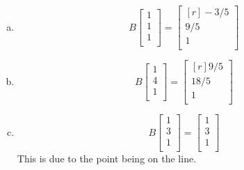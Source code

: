 \documentclass[../main.tex]{subfiles}
\begin{document}
\begin{enumerate}[a)]
	\item
		\[
			B
			\begin{bmatrix}
				1 \\
				1 \\
				1 \\
			\end{bmatrix}
			=
			\begin{bmatrix*}[r]
				-3/5 \\
				9/5 \\
				1 \\
			\end{bmatrix*}
		\]
	\item
		\[
			B
			\begin{bmatrix}
				1 \\
				4 \\
				1 \\
			\end{bmatrix}
			=
			\begin{bmatrix*}[r]
				9/5 \\
				18/5 \\
				1 \\
			\end{bmatrix*}
		\]
	\item
		\[
			B
			\begin{bmatrix}
				1 \\
				3 \\
				1 \\
			\end{bmatrix}
			=
			\begin{bmatrix}
				1 \\
				3 \\
				1 \\
			\end{bmatrix}
		\]
		This is due to the point being on the line.
\end{enumerate}
\end{document}
